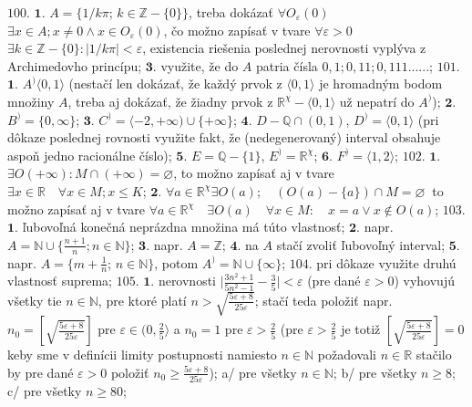 $\boxed{100.}$
$\boldsymbol{1.}$
$ A=\lbrace 1/k \pi; \, k \in \mathbb{Z}- \lbrace 0 \rbrace \rbrace $, treba dokázať $ \forall O_{\varepsilon} (0) $ $ \exists x \in A; x \ne 0 \land x \in O_{\varepsilon} (0) $, čo možno zapísať v tvare $ \forall \varepsilon > 0 $ $ \exists k \in \mathbb{Z}- \lbrace0\rbrace : \vert 1/k \pi \vert < \varepsilon $, existencia riešenia poslednej nerovnosti vyplýva z Archimedovho princípu;
$\boldsymbol{3.}$
využite, že do $ A $ patria čísla $ 0,1;0,11;0,111...... $;
$\boxed{101.}$
$\boldsymbol{1.}$
$ A^{)} \langle0,1\rangle $ (nestačí len dokázať, že každý prvok z $ \langle0,1\rangle $ je hromadným bodom množiny $ A $, treba aj dokázať, že žiadny prvok z $ \mathbb{R}^{\chi} - \langle0,1\rangle $ už nepatrí do $ A^{)} $);
$\boldsymbol{2.}$
$ B^{)}= \lbrace0,\infty \rbrace $;
$\boldsymbol{3.}$
$ C ^{)}=\langle-2,+ \infty) \cup \lbrace+\infty\rbrace $;
$\boldsymbol{4.}$
$ D- \mathbb{Q} \cap (0,1) $, $ D^{)} = \langle0,1\rangle$ (pri dôkaze poslednej rovnosti využite fakt, že (nedegenerovaný) interval obsahuje aspoň jedno racionálne číslo);
$\boldsymbol{5.}$
$ E= \mathbb{Q}-\lbrace1\rbrace $, $ E^{)}=\mathbb{R}^{\chi} $;
$\boldsymbol{6.}$
$ F^{)}=\langle1,2\rangle $;
$\boxed{102.}$
$\boldsymbol{1.}$
$ \exists O(+ \infty):M \cap (+ \infty)=\varnothing $, to možno zapísať aj v tvare $ \exists x \in \mathbb{R} \quad \forall x \in M; x\leq K $;
$\boldsymbol{2.}$
$ \forall a \in \mathbb{R}^{\chi} \exists O(a); \quad (O(a)-\lbrace a \rbrace ) \cap M= \varnothing \ $ to možno zapísať aj v tvare $ \forall a \in \mathbb{R}^{\chi} \quad  \exists O(a) \quad \forall x \in M: \quad x=a \lor x \notin O(a)  $;
$\boxed{103.}$
$\boldsymbol{1.}$
ľubovoľná konečná neprázdna množina má túto vlastnosť;
$\boldsymbol{2.}$
napr. $ A= \mathbb{N} \cup \lbrace \frac{n+1}{n}; n\in \mathbb{N} \rbrace$;
$\boldsymbol{3.}$
napr. $ A= \mathbb{Z} $;
$\boldsymbol{4.}$
na $ A $ stačí zvoliť ľubovoľný interval;
$\boldsymbol{5.}$
napr. $ A= \lbrace m+ \frac{1}{n}; \, n \in \mathbb{N} \rbrace $, potom $ A^{)}= \mathbb{N} \cup \lbrace \infty \rbrace $;
$\boxed{104.}$
pri dôkaze využite druhú vlastnosť suprema;
$\boxed{105.}$
$\boldsymbol{1.}$
nerovnosti $ \vert \frac{3n^{2}+1}{5n^{2}-1} - \frac{3}{5} \vert < \varepsilon $ (pre dané $ \varepsilon> 0 $) vyhovujú všetky tie $ n \in \mathbb{N} $, pre ktoré platí $ n > \sqrt{\frac{5\varepsilon +8}{25 \varepsilon}} $; stačí teda položiť napr. $ n_{0}= [  \sqrt{\frac{5\varepsilon +8}{25 \varepsilon}}]   $ pre $ \varepsilon \in (0, \frac{2}{5}\rangle $ a $ n_{0}= 1 $ pre $ \varepsilon > \frac{2}{5} $ (pre $ \varepsilon > \frac{2}{5} $ je totiž $ [  \sqrt{\frac{5\varepsilon +8}{25 \varepsilon}}] =0 $ keby  sme v definícii limity postupnosti namiesto $n \in \mathbb{N}  $ požadovali $ n \in \mathbb{R} $ stačilo by pre dané $ \varepsilon > 0 $ položiť $ n_{0} \geq   \frac{5\varepsilon +8}{25 \varepsilon }$); a/ pre všetky $  n \in \mathbb{N} $; b/ pre všetky $ n\geq 8 $; c/ pre všetky $ n\geq 80 $;
